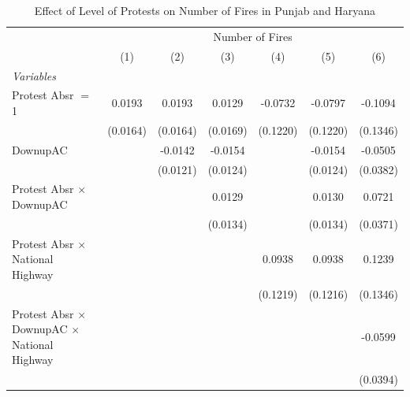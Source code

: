 
\begin{table}[htbp]
   \caption{\label{tab:protest_treat_main} Effect of Level of Protests on Number of Fires in Punjab and Haryana}
   \centering
   \begin{tabular}{lcccccc}
      \tabularnewline \midrule \midrule
       & \multicolumn{6}{c}{Number of Fires}\\
                                                                 & (1)           & (2)           & (3)           & (4)           & (5)           & (6)\\  
      \midrule
      \emph{Variables}\\
      Protest Absr $=$ 1                                         & 0.0193        & 0.0193        & 0.0129        & -0.0732       & -0.0797       & -0.1094\\   
                                                                 & (0.0164)      & (0.0164)      & (0.0169)      & (0.1220)      & (0.1220)      & (0.1346)\\   
      DownupAC                                                   &               & -0.0142       & -0.0154       &               & -0.0154       & -0.0505\\   
                                                                 &               & (0.0121)      & (0.0124)      &               & (0.0124)      & (0.0382)\\   
      Protest Absr $\times$ DownupAC                             &               &               & 0.0129        &               & 0.0130        & 0.0721\\   
                                                                 &               &               & (0.0134)      &               & (0.0134)      & (0.0371)\\   
      Protest Absr $\times$ National Highway                     &               &               &               & 0.0938        & 0.0938        & 0.1239\\   
                                                                 &               &               &               & (0.1219)      & (0.1216)      & (0.1346)\\   
      Protest Absr $\times$ DownupAC $\times$ National Highway   &               &               &               &               &               & -0.0599\\   
                                                                 &               &               &               &               &               & (0.0394)\\   

\end{tabular}
\end{table}
